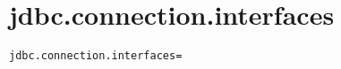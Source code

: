 \section{jdbc.connection.interfaces}
\label{configuration:JdbcConnectionInterfaces}
\ClearAPI
\TODO
{}
\begin{lstlisting}[style=Props,caption={Usage example for \textit{jdbc.connection.interfaces}}]
jdbc.connection.interfaces=
\end{lstlisting}